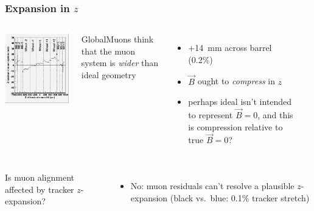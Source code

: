 \documentclass[compress]{beamer}
\begin{document}
\begin{frame}
\frametitle{Expansion in $z$}

\begin{columns}
\includegraphics[width=\linewidth]{zresid_from_muon.png}

GlobalMuons think that the muon system is {\it wider} than ideal geometry

\vspace{-0.1 cm}
\begin{itemize}\setlength{\itemsep}{-0.05 cm}
\item $+$14~mm across barrel (0.2\%)
\item $\vec{B}$ ought to {\it compress} in $z$
\item perhaps ideal isn't intended to represent $\vec{B}=0$, and this is compression relative to true $\vec{B}=0$?
\end{itemize}

\mbox{ }
\end{columns}

\vspace{-0.75 cm}
\begin{columns}

\vspace{0.75 cm}
Is muon alignment affected by tracker $z$-expansion?
\begin{itemize}
\item No: muon residuals can't resolve a plausible
  $z$-expansion (black vs.\ blue: 0.1\% tracker stretch)


\end{itemize}
\end{columns}
\end{frame}
\end{document}
